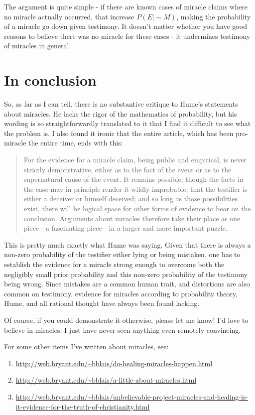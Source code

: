 The argument is quite simple - if there are known cases of miracle
claims where no miracle actually occurred, that increase
\(P(E|\sim\!M)\), making the probability of a miracle go down given
testimony. It doesn't matter whether you have good reasons to believe
there was no miracle for these cases - it undermines testimony of
miracles in general.

\section{In conclusion}\label{in-conclusion}

So, as far as I can tell, there is no substantive critique to Hume's
statements about miracles. He lacks the rigor of the mathematics of
probability, but his wording is so straightforwardly translated to it
that I find it difficult to see what the problem is. I also found it
ironic that the entire article, which has been pro-miracle the entire
time, ends with this:

\begin{quote}
For the evidence for a miracle claim, being public and empirical, is
never strictly demonstrative, either as to the fact of the event or as
to the supernatural cause of the event. It remains possible, though the
facts in the case may in principle render it wildly improbable, that the
testifier is either a deceiver or himself deceived; and so long as those
possibilities exist, there will be logical space for other forms of
evidence to bear on the conclusion. Arguments about miracles therefore
take their place as one piece---a fascinating piece---in a larger and
more important puzzle.
\end{quote}

This is pretty much exactly what Hume was saying. Given that there is
always a non-zero probability of the testifier either lying or being
mistaken, one has to establish the evidence for a miracle strong enough
to overcome both the negligibly small prior probability and this
non-zero probability of the testimony being wrong. Since mistakes are a
common human trait, and distortions are also common on testimony,
evidence for miracles according to probability theory, Hume, and all
rational thought have always been found lacking.

Of course, if you could demonstrate it otherwise, please let me know!
I'd love to believe in miracles. I just have never seen anything even
remotely convincing.

For some other items I've written about miracles, see:

\begin{enumerate}
\def\labelenumi{\arabic{enumi}.}
\itemsep1pt\parskip0pt
\item
  \url{http://web.bryant.edu/~bblais/do-healing-miracles-happen.html}
\item
  \url{http://web.bryant.edu/~bblais/a-little-about-miracles.html}
\item
  \url{http://web.bryant.edu/~bblais/unbelievable-project-miracles-and-healing-is-it-evidence-for-the-truth-of-christianity.html}
\end{enumerate}
